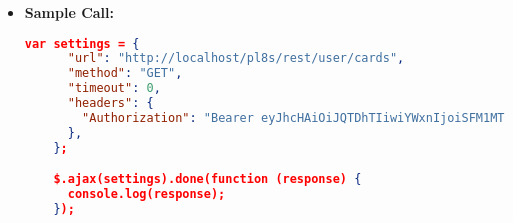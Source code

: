 \begin{itemize}
\begin{itemize}
\begin{lstlisting}[language=json]
        "message": {
            "message": "Cannot authenticate the user.",
            "error-code": "EF00",
            "error-details": "Invalid JWT."
        }
    }			
			\end{lstlisting}
		\end{itemize}
    	\begin{itemize}
			\item[$\circ$] \textbf{Code:} 500 Internal Server Error
			\item[] \textbf{Content:}
			\begin{lstlisting}[language=json]
	{
        "message": {
            "message": "Fatal error while retrieving user.",
            "error-code": "ED00",
            "error-details": "Cannot retrieve the user: Unexpected db error."
        }
    }			
			\end{lstlisting}
		\end{itemize}
    	\begin{itemize}
			\item[$\circ$] \textbf{Code:} 500 Internal Server Error
			\item[] \textbf{Content:}
			\begin{lstlisting}[language=json]
	{
        "message": {
            "message": "Cannot retrieve the user payment methods.",
            "error-code": "ES00",
            "error-details": "Cannot retrieve the user payment methods."
        }
    }			
			\end{lstlisting}
		\end{itemize}				
    \item \textbf{Sample Call:}
		\begin{lstlisting}[language=json]		
    var settings = {
      "url": "http://localhost/pl8s/rest/user/cards",
      "method": "GET",
      "timeout": 0,
      "headers": {
        "Authorization": "Bearer eyJhcHAiOiJQTDhTIiwiYWxnIjoiSFM1MTIifQ.eyJ1aWQiOjMsInJvbCI6ImN1c3RvbWVyIi wic3R yIjoiY3VzX1B3OHJKbmd5eldOcmZ5IiwiZGF0IjoxNzE0MzI5NTYzODk1fQ.dy9GSq4 X3sGora MkCnvD4bZdtlPtiMjBpPxdN6Ul2I5tgreCK_pRn6K0UXe2AXIp3XMQ4p-W9AJ8W79 vtFdLng"
      },
    };

    $.ajax(settings).done(function (response) {
      console.log(response);
    });
	\end{lstlisting}
  \end{itemize}		
